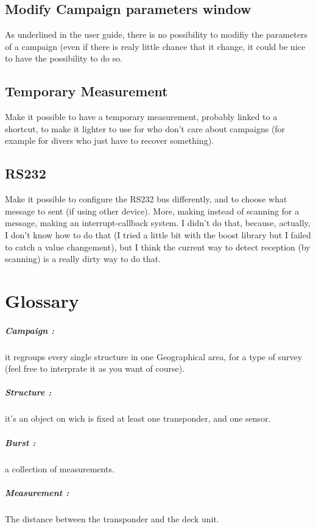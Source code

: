 \documentclass[11pt]{report}
\begin{document}
	    \section{Modify Campaign parameters window}
		As underlined in the user guide, there is no possibility to modifiy the parameters of a campaign (even if there is realy 
		little chance that it change, it could be nice to have the possibility to do so.

	    \section{Temporary Measurement}
		Make it possible to have a temporary measurement, probably linked to a shortcut, to make it lighter to use for who don't 
		care about campaigns (for example for divers who just have to recover something).

	    \section{RS232}
		Make it possible to configure the RS232 bus differently, and to choose what message to sent (if using other device).
		More, making instead of scanning for a message, making an interrupt-callback system. I didn't do that, because, actually, 
		I don't know how to do that (I tried a little bit with the boost library but I failed to catch a value changement), but 
		I think the current way to detect reception (by scanning) is a really dirty way to do that.


	\chapter{Glossary}
	    \paragraph{Campaign :} it regroups every single structure in one Geographical area, for a type of survey (feel free to 
	    interprate it as you want of course).
	    \paragraph{Structure :} it's an object on wich is fixed at least one transponder, and one sensor.
	    \paragraph{Burst :} a collection of measurements.
	    \paragraph{Measurement :} The distance between the transponder and the deck unit.
\end{document}
